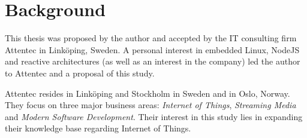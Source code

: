 \chapter{Background}
\label{cha:background}

This thesis was proposed by the author and accepted by the IT consulting firm
Attentec in Linköping, Sweden. A personal interest in embedded Linux, NodeJS
and reactive architectures (as well as an interest in the company) led the
author to Attentec and a proposal of this study.

Attentec resides in Linköping and Stockholm in Sweden and in Oslo, Norway. They
focus on three major business areas: \textit{Internet of Things},
\textit{Streaming Media} and \textit{Modern Software Development}.  Their
interest in this study lies in expanding their knowledge base regarding
Internet of Things.

